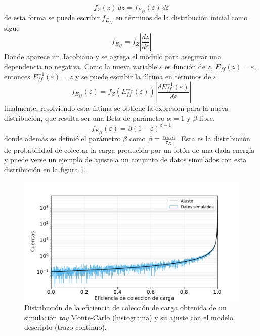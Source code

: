 \begin{equation*}
    f_{Z}(z)\,dz = f_{E_{ff}}(\varepsilon)\,d\varepsilon
\end{equation*}
de esta forma se puede escribir $f_{E_{ff}}$ en términos de la distribución inicial como sigue
\begin{equation*}
    f_{E_{ff}} 
    = f_{Z}
    \left|
        \frac{dz}{d\varepsilon}
    \right|
\end{equation*}
Donde aparece un Jacobiano y se agrega el módulo para asegurar una dependencia no negativa. Como la nueva variable $\varepsilon$ es función de $z$, $E_{ff}(z) = \varepsilon$, entonces $E_{ff}^{-1}(\varepsilon) = z$ y se puede escribir la última en términos de $\varepsilon$
\begin{equation*}
    f_{E_{ff}}(\varepsilon) 
    = f_{Z}
    \left(
        E_{ff}^{-1}(\varepsilon)
    \right)
    \left|
        \frac{dE_{ff}^{-1}(\varepsilon)}{d\varepsilon}
    \right|
\end{equation*}
finalmente, resolviendo esta última se obtiene la expresión para la nueva distribución, que resulta ser una Beta de parámetro $\alpha = 1$ y $\beta$ libre.
\begin{equation*}
    f_{E_{ff}}(\varepsilon) = \beta (1 - \varepsilon)^{\beta - 1}
\end{equation*}
donde además se definió el parámetro $\beta$ como $\beta = \frac{\tau_{\scaleto{CCE}{3pt}}}{\tau_{\scaleto{X}{3pt}}}$. Esta es la distribución de probabilidad de colectar la carga producida por un fotón de una dada energía y puede verse un ejemplo de ajuste a un conjunto de datos simulados con esta distribución en la figura \ref{fig:BetaDistyAjuste}.
\begin{figure}[h]
    \centering
        \includegraphics[scale=0.5]{Figs/BetaDistyAjuste.pdf}
    \caption{\footnotesize{Distribución de la eficiencia de colección de carga obtenida de un simulación \textit{toy} Monte-Carlo (histograma) y su ajuste con el modelo descripto (trazo continuo).}}
    \label{fig:BetaDistyAjuste}
\end{figure}

